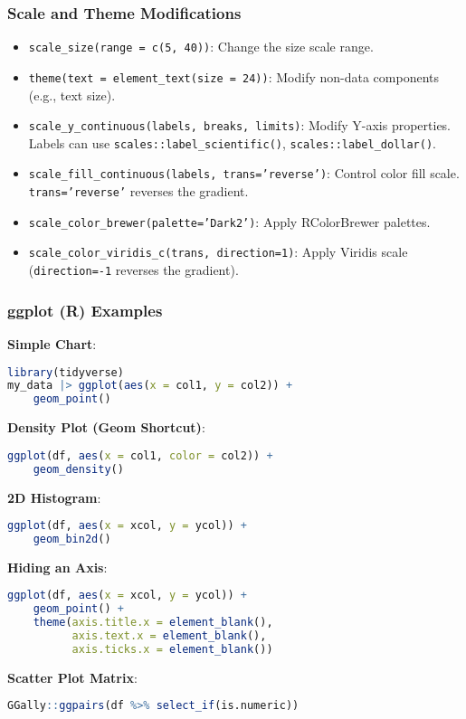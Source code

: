 \documentclass[8pt,landscape]{article}
\newcommand{\code}[1]{\textcolor{myred}{\texttt{#1}}}
\newcommand{\smalltext}[1]{%
  {\fontsize{8}{9}\selectfont\sloppy #1\par}%
}
\begin{document}
\begin{multicols}{3}
\subsubsection*{Scale and Theme Modifications}
\begin{itemize}
\item \code{scale\_size(range = c(5, 40))}: Change the size scale range.
\item \code{theme(text = element\_text(size = 24))}: Modify non-data components (e.g., text size).
\item \code{scale\_y\_continuous(labels, breaks, limits)}: Modify Y-axis properties. Labels can use \code{scales::label\_scientific()}, \code{scales::label\_dollar()}.
\item \code{scale\_fill\_continuous(labels, trans='reverse')}: Control color fill scale. \code{trans='reverse'} reverses the gradient.
\item \code{scale\_color\_brewer(palette='Dark2')}: Apply RColorBrewer palettes.
\item \code{scale\_color\_viridis\_c(trans, direction=1)}: Apply Viridis scale (\code{direction=-1} reverses the gradient).
\end{itemize}

\subsubsection*{ggplot (R) Examples}
\smalltext{\textbf{Simple Chart}:}
\begin{lstlisting}[language=R]
library(tidyverse)
my_data |> ggplot(aes(x = col1, y = col2)) +
    geom_point()
\end{lstlisting}
\smalltext{\textbf{Density Plot (Geom Shortcut)}:}
\begin{lstlisting}[language=R]
ggplot(df, aes(x = col1, color = col2)) +
    geom_density()
\end{lstlisting}
\smalltext{\textbf{2D Histogram}:}
\begin{lstlisting}[language=R]
ggplot(df, aes(x = xcol, y = ycol)) +
    geom_bin2d()
\end{lstlisting}
\smalltext{\textbf{Hiding an Axis}:}
\begin{lstlisting}[language=R]
ggplot(df, aes(x = xcol, y = ycol)) +
    geom_point() +
    theme(axis.title.x = element_blank(),
          axis.text.x = element_blank(),
          axis.ticks.x = element_blank())
\end{lstlisting}
\smalltext{\textbf{Scatter Plot Matrix}:}
\begin{lstlisting}[language=R]
GGally::ggpairs(df %>% select_if(is.numeric))
\end{lstlisting}

\end{multicols}
\end{document}
